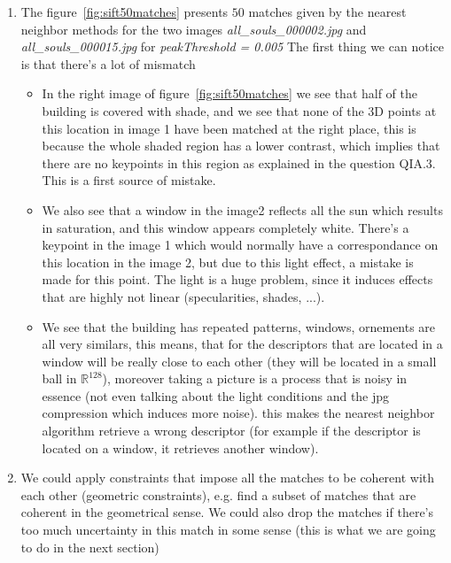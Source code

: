 \documentclass{article}
\begin{document}
\begin{enumerate}

\item The figure~\ref{fig:sift50matches} presents $50$ matches given
  by the nearest neighbor methods for the two images \emph{all\_souls\_000002.jpg} and
  \emph{all\_souls\_000015.jpg} for \emph{peakThreshold = 0.005}
  The first thing we can notice is that there's a lot of mismatch

  \begin{itemize}
  \item In the right image of figure~\ref{fig:sift50matches} we see
    that half of the building is covered with shade, and we see that
    none of the 3D points at this location in image 1 have been
    matched at the right place, this is because the whole shaded
    region has a lower contrast, which implies that there are no
    keypoints in this region as explained in the question QIA.3.
    This is a first source of mistake.

  \item We also see that a window in the image2 reflects all the sun
    which results in saturation, and this window appears completely
    white. There's a keypoint in the image 1 which would normally have
    a correspondance on this location in the image 2, but due to this
    light effect, a mistake is made for this point. The light is a huge
    problem, since it induces effects that are highly not linear
    (specularities, shades, ...).

  \item We see that the building has repeated patterns, windows,
    ornements are all very similars, this means, that for the
    descriptors that are located in a window will be really close to
    each other (they will be located in a small ball in
    $\mathbb{R}^{128}$), moreover taking a picture is a process that
    is noisy in essence (not even talking about the light conditions
    and the jpg compression which induces more noise). this makes the
    nearest neighbor algorithm retrieve a wrong descriptor (for
    example if the descriptor is located on a window, it retrieves
    another window).

  \end{itemize}


\item We could apply constraints that impose all the matches to be
  coherent with each other (geometric constraints), e.g. find a subset
  of matches that are coherent in the geometrical sense. We could also
  drop the matches if there's too much uncertainty in this match in
  some sense (this is what we are going to do in the next section)

\end{enumerate}
\end{document}
